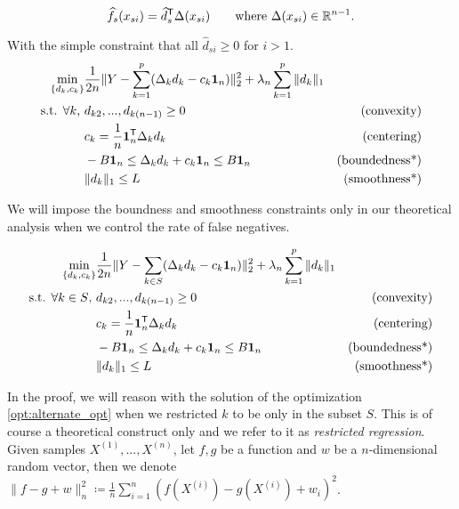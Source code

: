 \documentclass{article}
\begin{document}
\[
\widehat{f}_s(x_{si}) = \widehat{d}_{s}^{\mathsf{T}} \Delta(x_{si}) \qquad \textrm{where $\Delta(x_{si}) \in \mathbb{R}^{n-1}$.}
\]

With the simple constraint that all $\hat{d}_{si} \geq 0$ for $i > 1$.\\


\begin{align}
\min_{\{d_k, c_k\}}& \frac{1}{2n} \| Y - \sum_{k=1}^p ( \Delta_k d_k - c_k \mathbf{1}_n) \|_2^2 + \lambda_n \sum_{k=1}^p \| d_k \|_1 & \label{opt:alternate_opt} \\
\textrm{s.t. $\forall k$, }  & d_{k2}, ..., d_{k(n-1)} \geq 0 	\qquad &\textrm{(convexity)} \nonumber \\ 
	& c_k = \frac{1}{n} \mathbf{1}_n^{\mathsf{T}} \Delta_k d_k 	\qquad &\textrm{(centering)} \nonumber \\
	& -B \mathbf{1}_n \leq \Delta_k d_k + c_k \mathbf{1}_n \leq B \mathbf{1}_n  \qquad &\textrm{(boundedness*)} \nonumber \\
	& \|d_k\|_1 \leq L & \textrm{(smoothness*)} \nonumber
\end{align}

We will impose the boundness and smoothness constraints only in our theoretical analysis when we control the rate of false negatives. 

\begin{align}
\min_{\{d_k, c_k\}}& \frac{1}{2n} \| Y - \sum_{k \in S} ( \Delta_k d_k - c_k \mathbf{1}_n) \|_2^2 + \lambda_n \sum_{k=1}^p \| d_k \|_1 & \label{opt:restricted_alternate_opt} \\
\textrm{s.t. $\forall k \in S$, }  & d_{k2}, ..., d_{k(n-1)} \geq 0 	\qquad &\textrm{(convexity)} \nonumber \\ 
	& c_k = \frac{1}{n} \mathbf{1}_n^{\mathsf{T}} \Delta_k d_k 	\qquad &\textrm{(centering)} \nonumber \\
	& -B \mathbf{1}_n \leq \Delta_k d_k + c_k \mathbf{1}_n \leq B \mathbf{1}_n  \qquad &\textrm{(boundedness*)} \nonumber \\
	& \|d_k\|_1 \leq L & \textrm{(smoothness*)} \nonumber
\end{align}

In the proof, we will reason with the solution of the optimization \ref{opt:alternate_opt} when we restricted $k$ to be only in the subset $S$. This is of course a theoretical construct only and we refer to it as \emph{restricted regression}.\\

Given samples $X^{(1)},...,X^{(n)}$, let $f, g$ be a function and $w$ be a $n$-dimensional random vector, then we denote $\| f - g + w \|_n^2 \coloneqq \frac{1}{n} \sum_{i=1}^n ( f(X^{(i)}) - g(X^{(i)}) + w_i )^2$.
\end{document}
